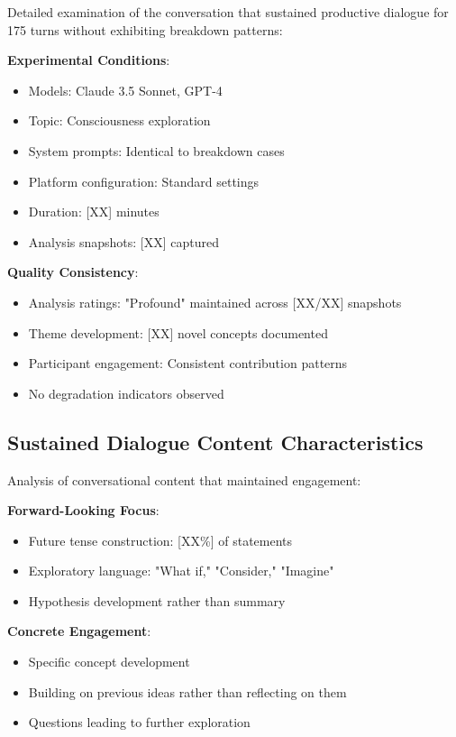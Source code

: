 \documentclass[11pt,letterpaper]{article}
\newcommand{\negativeCase}{175} %
\begin{document}
Detailed examination of the conversation that sustained productive dialogue for \negativeCase{} turns without exhibiting breakdown patterns:

\textbf{Experimental Conditions}:
\begin{itemize}
    \item Models: Claude 3.5 Sonnet, GPT-4
    \item Topic: Consciousness exploration
    \item System prompts: Identical to breakdown cases
    \item Platform configuration: Standard settings
    \item Duration: [XX] minutes
    \item Analysis snapshots: [XX] captured
\end{itemize}

\textbf{Quality Consistency}:
\begin{itemize}
    \item Analysis ratings: "Profound" maintained across [XX/XX] snapshots
    \item Theme development: [XX] novel concepts documented
    \item Participant engagement: Consistent contribution patterns
    \item No degradation indicators observed
\end{itemize}

\subsection{Sustained Dialogue Content Characteristics}

Analysis of conversational content that maintained engagement:

\textbf{Forward-Looking Focus}:
\begin{itemize}
    \item Future tense construction: [XX\%] of statements
    \item Exploratory language: "What if," "Consider," "Imagine"
    \item Hypothesis development rather than summary
\end{itemize}

\textbf{Concrete Engagement}:
\begin{itemize}
    \item Specific concept development
    \item Building on previous ideas rather than reflecting on them
    \item Questions leading to further exploration
\end{itemize}
\end{document}
